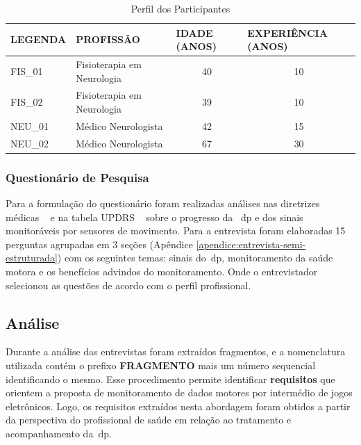\begin{table}[h]
\caption{Perfil dos Participantes}
\label{table:perfil_analise_participantes}
\begin{tabular}{|l|l|c|c|}
\hline
\textbf{LEGENDA} & \textbf{PROFISSÃO}             & \multicolumn{1}{|l}{\textbf{IDADE (ANOS)}} & \multicolumn{1}{|l|}{\textbf{EXPERIÊNCIA (ANOS)}} \\ \hline
FIS\_01          & Fisioterapia em Neurologia & 40                                         & 10                                                \\ \hline
FIS\_02          & Fisioterapia em Neurologia     & 39                                         & 10                                                \\ \hline
NEU\_01          & Médico Neurologista            & 42                                         & 15                                                \\ \hline
NEU\_02          & Médico Neurologista            & 67                                         & 30                                                \\ \hline
\end{tabular}

\end{table}

\subsubsection{Questionário de Pesquisa}
Para a formulação do questionário foram realizadas análises nas diretrizes médicas ~\cite{protpar010,national2006parkinson} e na tabela UPDRS ~\cite{updrs87} sobre o progresso da ~\ac{dp} e dos sinais monitoráveis por sensores de movimento. Para a entrevista foram elaboradas 15 perguntas agrupadas em 3 seções (Apêndice \ref{apendice:entrevista-semi-estruturada}) com os seguintes temas: sinais do~\ac{dp}, monitoramento da saúde motora e os benefícios advindos do monitoramento. Onde o entrevistador selecionou as questões de acordo com o perfil profissional.

\subsection{Análise}
Durante a análise das entrevistas foram extraídos fragmentos, e a nomenclatura utilizada contém o prefixo \textbf{FRAGMENTO} mais um número sequencial identificando o mesmo. Esse procedimento permite identificar \textbf{requisitos} que orientem a proposta de monitoramento de dados motores por intermédio de jogos eletrônicos. Logo, os requisitos extraídos nesta abordagem foram obtidos a partir da perspectiva do profissional de saúde em relação ao tratamento e acompanhamento da~\ac{dp}. 

